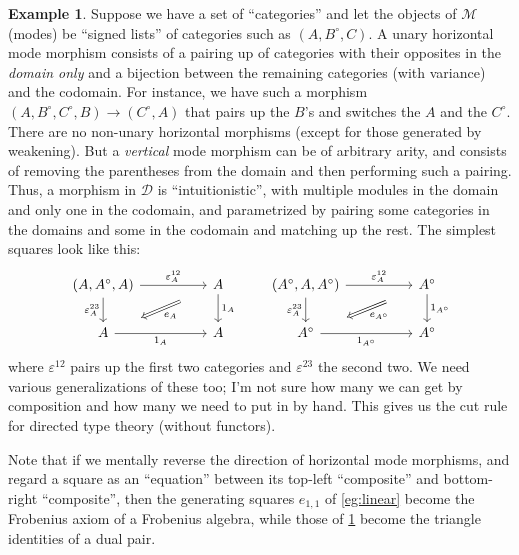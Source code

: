\documentclass{article}
\theoremstyle{definition}
\newtheorem{eg}[thm]{Example}
\theoremstyle{remark}
\def\M{\mathcal{M}}
\def\D{\mathcal{D}}
\def\o{^{\circ}}
\def\twocell#1#2#3{\ar[from=#1,to=#2,phantom,""{name=1,near start},""{name=2,near end}]\ar[Rightarrow,from=1,to=2,"#3"]}
\def\drtwocell{\twocell{r}{d}}
\begin{document}
\begin{eg}\label{eg:dirtt}
  Suppose we have a set of ``categories'' and let the objects of $\M$ (modes) be ``signed lists'' of categories such as $(A,B\o,C)$.
  A unary horizontal mode morphism consists of a pairing up of categories with their opposites in the \emph{domain only} and a bijection between the remaining categories (with variance) and the codomain.
  For instance, we have such a morphism $(A,B\o,C\o,B) \to (C\o,A)$ that pairs up the $B$'s and switches the $A$ and the $C\o$.
  There are no non-unary horizontal morphisms (except for those generated by weakening).
  But a \emph{vertical} mode morphism can be of arbitrary arity, and consists of removing the parentheses from the domain and then performing such a pairing.
  Thus, a morphism in $\D$ is ``intuitionistic'', with multiple modules in the domain and only one in the codomain, and parametrized by pairing some categories in the domains and some in the codomain and matching up the rest.
  The simplest squares look like this:
  \[\begin{tikzcd}[column sep=huge]
    (A,A\o,A) \ar[r,"\varepsilon^{12}_A"] \ar[d,swap,"\varepsilon^{23}_A"] \drtwocell{e_A}
    & A \ar[d,"1_A"]
    \\ A \ar[r,swap,"1_A"] & A
  \end{tikzcd}
  \qquad
  \begin{tikzcd}[column sep=huge]
    (A\o,A,A\o) \ar[r,"\varepsilon^{12}_A"] \ar[d,swap,"\varepsilon^{23}_A"] \drtwocell{e_{A\o}}
    & A\o \ar[d,"1_{A\o}"]
    \\ A\o \ar[r,swap,"1_{A\o}"] & A\o
  \end{tikzcd}\]
  where $\varepsilon^{12}$ pairs up the first two categories and $\varepsilon^{23}$ the second two.
  We need various generalizations of these too; I'm not sure how many we can get by composition and how many we need to put in by hand.
  This gives us the cut rule for directed type theory (without functors).
\end{eg}

Note that if we mentally reverse the direction of horizontal mode morphisms, and regard a square as an ``equation'' between its top-left ``composite'' and bottom-right ``composite'', then the generating squares $e_{1,1}$ of \cref{eg:linear} become the Frobenius axiom of a Frobenius algebra, while those of \cref{eg:dirtt} become the triangle identities of a dual pair.
\end{document}
